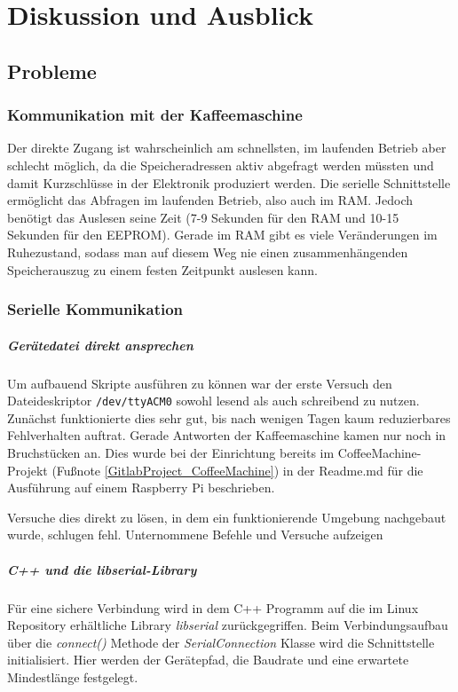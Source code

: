 \chapter{Diskussion und Ausblick}

\section{Probleme}

\subsection{Kommunikation mit der Kaffeemaschine} \label{subsec:zugangSeriellDirekt}
Der direkte Zugang ist wahrscheinlich am schnellsten, im laufenden Betrieb aber schlecht möglich, da die Speicheradressen aktiv abgefragt werden müssten und damit Kurzschlüsse in der Elektronik produziert werden. Die serielle Schnittstelle ermöglicht das Abfragen im laufenden Betrieb, also auch im \ac{RAM}. Jedoch benötigt das Auslesen seine Zeit (7-9 Sekunden für den \ac{RAM} und 10-15 Sekunden für den \ac{EEPROM}). Gerade im \ac{RAM} gibt es viele Veränderungen im Ruhezustand, sodass man auf diesem Weg nie einen zusammenhängenden Speicherauszug zu einem festen Zeitpunkt auslesen kann.

\subsection{Serielle Kommunikation} \label{subsec:kommunikationGeraetedateiLibserialLibrary}
\paragraph{Gerätedatei direkt ansprechen}
Um aufbauend Skripte ausführen zu können war der erste Versuch den Dateideskriptor \texttt{/dev/ttyACM0} sowohl lesend als auch schreibend zu nutzen. Zunächst funktionierte dies sehr gut, bis nach wenigen Tagen kaum reduzierbares Fehlverhalten auftrat. Gerade Antworten der Kaffeemaschine kamen nur noch in Bruchstücken an. Dies wurde bei der Einrichtung bereits im CoffeeMachine-Projekt (Fußnote \ref{GitlabProject_CoffeeMachine}) in der Readme.md für die Ausführung auf einem Raspberry Pi beschrieben.

Versuche dies direkt zu lösen, in dem ein funktionierende Umgebung nachgebaut wurde, schlugen fehl.
\todo Unternommene Befehle und Versuche aufzeigen

\paragraph{C++ und die \textit{libserial}-Library}
Für eine sichere Verbindung wird in dem C++ Programm auf die im Linux Repository erhältliche Library \textit{libserial} zurückgegriffen. Beim Verbindungsaufbau über die \textit{connect()} Methode der \textit{SerialConnection} Klasse wird die Schnittstelle initialisiert. Hier werden der Gerätepfad, die Baudrate und eine erwartete Mindestlänge festgelegt.

